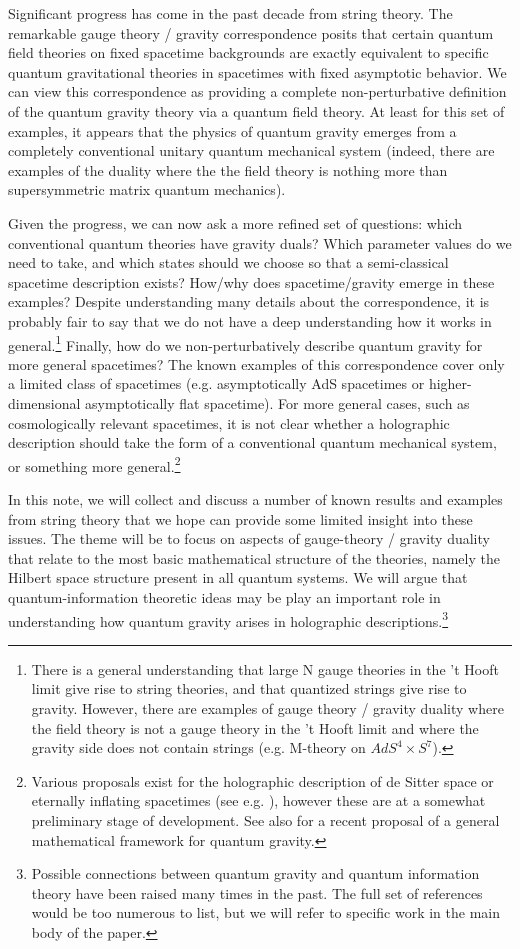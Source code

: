 \documentclass[12pt,epsf]{article}
\renewcommand{\(}{\left(}
\renewcommand{\)}{\right)}
\begin{document}
Significant progress has come in the past decade from string theory. The remarkable gauge theory / gravity correspondence \cite{bfss, malda,agmoo} posits that certain quantum field theories on fixed spacetime backgrounds are exactly equivalent to specific quantum gravitational theories in spacetimes with fixed asymptotic behavior. We can view this correspondence as providing a complete non-perturbative definition of the quantum gravity theory via a quantum field theory. At least for this set of examples, it appears that the physics of quantum gravity emerges from a completely conventional unitary quantum mechanical system (indeed, there are examples of the duality where the the field theory is nothing more than supersymmetric matrix quantum mechanics).

Given the progress, we can now ask a more refined set of questions: which conventional quantum theories have gravity duals? Which parameter values do we need to take, and which states should we choose so that a semi-classical spacetime description exists? How/why does spacetime/gravity emerge in these examples? Despite understanding many details about the correspondence, it is probably fair to say that we do not have a deep understanding how it works in general.\footnote{There is a general understanding that large N gauge theories in the 't Hooft limit give rise to string theories\cite{thooft}, and that quantized strings give rise to gravity. However, there are examples of gauge theory / gravity duality where the field theory is not a gauge theory in the 't Hooft limit and where the gravity side does not contain strings (e.g. M-theory on $AdS^4 \times S^7$).} Finally, how do we non-perturbatively describe quantum gravity for more general spacetimes? The known examples of this correspondence cover only a limited class of spacetimes (e.g. asymptotically AdS spacetimes or higher-dimensional asymptotically flat spacetime). For more general cases, such as cosmologically relevant spacetimes, it is not clear whether a holographic description should take the form of a conventional quantum mechanical system, or something more general.\footnote{Various proposals exist for the holographic description of de Sitter space or eternally inflating spacetimes (see e.g. \cite{strominger, gm, fssy,bf}), however these are at a somewhat preliminary stage of development. See also \cite{giddings} for a recent proposal of a general mathematical framework for quantum gravity.}

In this note, we will collect and discuss a number of known results and examples from string theory that we hope can provide some limited insight into these issues. The theme will be to focus on aspects of gauge-theory / gravity duality that relate to the most basic mathematical structure of the theories, namely the Hilbert space structure present in all quantum systems. We will argue that quantum-information theoretic ideas may be play an important role in understanding how quantum gravity arises in holographic descriptions.\footnote{Possible connections between quantum gravity and quantum information theory have been raised many times in the past. The full set of references would be too numerous to list, but we will refer to specific work in the main body of the paper.}
\end{document}
